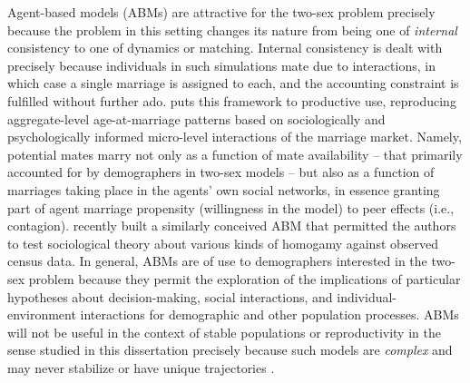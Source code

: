 Agent-based models (ABMs) are attractive for the two-sex problem
precisely because the problem in this setting changes its nature from being one of 
\textit{internal} consistency 
to one of dynamics or matching. Internal consistency is dealt with precisely
because individuals in such simulations mate due to interactions,
in which case a single marriage is assigned to each, and the accounting
constraint is fulfilled without further ado. \citet{billari2002wedding} puts
this framework to productive use, reproducing aggregate-level age-at-marriage
patterns based on sociologically and psychologically informed micro-level
interactions of the marriage market. Namely, potential mates marry not only as a
function of mate availability -- that primarily accounted for by demographers
in two-sex models -- but also as a function of marriages taking place in the
agents' own social networks, in essence granting part of agent marriage
propensity (willingness in the model) to peer effects (i.e., contagion).
\citet{walker2013modeling} recently built a similarly conceived ABM that
permitted the authors to test sociological theory about various kinds of 
homogamy against observed census data. In general,
ABMs are of use to demographers interested in the two-sex problem because they 
permit the exploration of the implications of
particular hypotheses about decision-making, social interactions, and
individual-environment interactions for demographic and other population
processes. ABMs will not be useful in the context of stable populations or reproductivity in the sense
studied in this dissertation precisely because such models are \textit{complex}
and may never stabilize or have unique trajectories
\citep{RePEc:ssb:dispap:247}.




